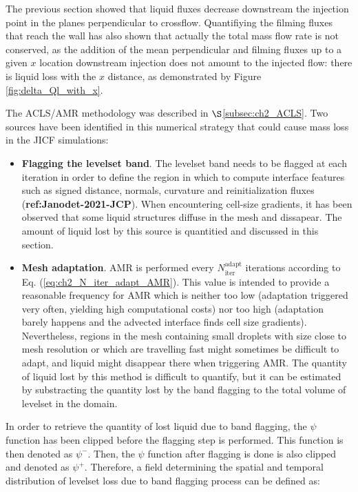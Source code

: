 The previous section showed that liquid fluxes decrease downstream the injection point in the planes perpendicular to crossflow. Quantifiying the filming fluxes that reach the wall has also shown that actually the total mass flow rate is not conserved, as the addition of the mean perpendicular and filming fluxes up to a given $x$ location downstream injection does not amount to the injected flow: there is liquid loss with the $x$ distance, as demonstrated by Figure \ref{fig:delta_Ql_with_x}.

The ACLS/AMR methodology was described in $\S$\ref{subsec:ch2_ACLS}. Two sources have been identified in this numerical strategy that could cause mass loss in the JICF simulations: 

\begin{itemize}

	\item \textbf{Flagging the levelset band}. The levelset band needs to be flagged at each iteration in order to define the region in which to compute interface features such as signed distance, normals, curvature and reinitialization fluxes (\textbf{ref:Janodet-2021-JCP}). When encountering cell-size gradients, it has been observed that some liquid structures diffuse in the mesh and dissapear. The amount of liquid lost by this source is quantitied and discussed in this section.
	
	\item \textbf{Mesh adaptation}. AMR is performed every $N_\mathrm{iter}^\mathrm{adapt}$ iterations according to Eq. (\ref{eq:ch2_N_iter_adapt_AMR}). This value is intended to provide a reasonable frequency for AMR which is neither too low (adaptation triggered very often, yielding high computational costs) nor too high (adaptation barely happens and the advected interface finds cell size gradients). Nevertheless, regions in the mesh containing small droplets with size close to mesh resolution or which are travelling fast might sometimes be difficult to adapt, and liquid might disappear there when triggering AMR. The quantity of liquid lost by this method is difficult to quantify, but it can be estimated by substracting the quantity lost by the band flagging to the total volume of levelset in the domain.

\end{itemize}

In order to retrieve the quantity of lost liquid due to band flagging, the $\psi$ function has been clipped before the flagging step is performed. This function is then denoted as $\psi^-$. Then, the  $\psi$ function after flagging is done is also clipped and denoted as $\psi^+$. Therefore, a field determining the spatial and temporal distribution of levelset loss due to band flagging process can be defined as:

